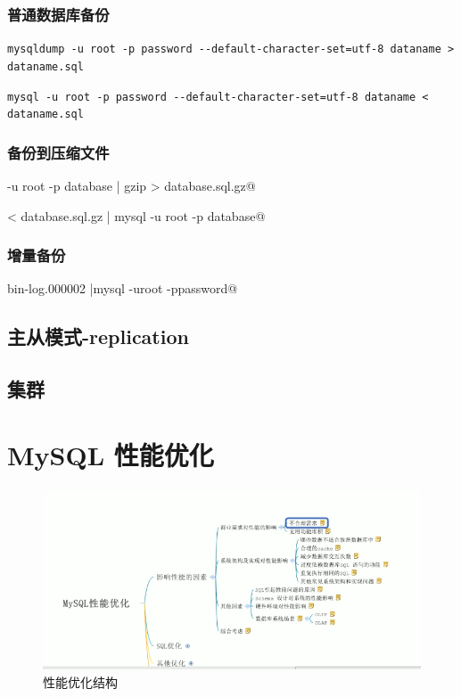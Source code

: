 \documentclass[UTF8,a4paper,12pt]{ctexbook}
\begin{document}
		\subsection{普通数据库备份}
			\verb|mysqldump -u root -p password --default-character-set=utf-8 dataname > dataname.sql|
			
			\verb|mysql -u root -p password --default-character-set=utf-8 dataname < dataname.sql|
		\subsection{备份到压缩文件}
			\verb@mysqldump -u root -p database | gzip > database.sql.gz@
			
			\verb@gzip < database.sql.gz | mysql -u root -p database@
		\subsection{增量备份}
			\verb@mysqlbinlog bin-log.000002 |mysql -uroot -ppassword@
		

	\section{主从模式-replication}
	
	\section{集群}



\chapter{MySQL 性能优化}
	\begin{figure}[H]
		\centering
		\includegraphics[scale=0.7]{xingNeng}
		\caption{性能优化结构}
	\end{figure}
	
\end{document}
